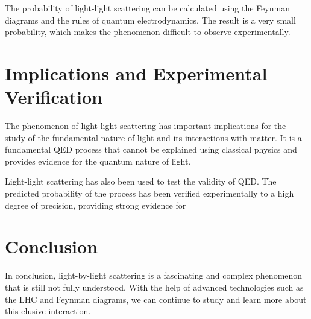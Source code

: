 \documentclass{article}
\begin{document}
The probability of light-light scattering can be calculated using the Feynman diagrams and the rules of quantum electrodynamics. The result is a very small probability, which makes the phenomenon difficult to observe experimentally.

\section{Implications and Experimental Verification}

The phenomenon of light-light scattering has important implications for the study of the fundamental nature of light and its interactions with matter. It is a fundamental QED process that cannot be explained using classical physics and provides evidence for the quantum nature of light.

Light-light scattering has also been used to test the validity of QED. The predicted probability of the process has been verified experimentally to a high degree of precision, providing strong evidence for

\section{Conclusion}

In conclusion, light-by-light scattering is a fascinating and complex phenomenon that is still not fully understood. With the help of advanced technologies such as the LHC and Feynman diagrams, we can continue to study and learn more about this elusive interaction.
\end{document}
